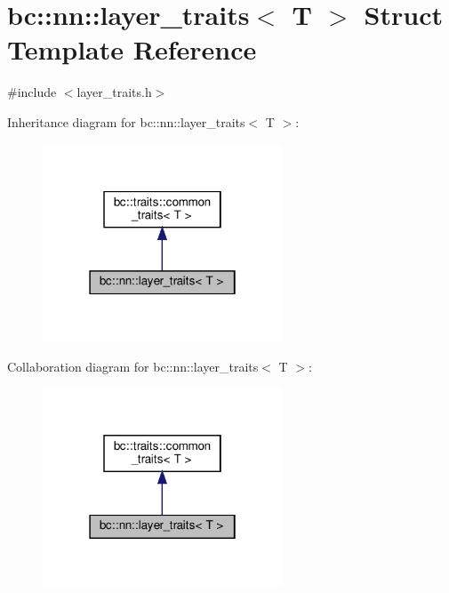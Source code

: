 \hypertarget{structbc_1_1nn_1_1layer__traits}{}\section{bc\+:\+:nn\+:\+:layer\+\_\+traits$<$ T $>$ Struct Template Reference}
\label{structbc_1_1nn_1_1layer__traits}


{\ttfamily \#include $<$layer\+\_\+traits.\+h$>$}



Inheritance diagram for bc\+:\+:nn\+:\+:layer\+\_\+traits$<$ T $>$\+:\nopagebreak
\begin{figure}[H]
\begin{center}
\leavevmode
\includegraphics[width=202pt]{structbc_1_1nn_1_1layer__traits__inherit__graph}
\end{center}
\end{figure}


Collaboration diagram for bc\+:\+:nn\+:\+:layer\+\_\+traits$<$ T $>$\+:\nopagebreak
\begin{figure}[H]
\begin{center}
\leavevmode
\includegraphics[width=202pt]{structbc_1_1nn_1_1layer__traits__coll__graph}
\end{center}
\end{figure}
